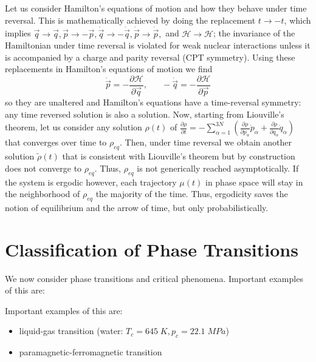 \documentclass[12pt, a4paper, oneside, openright, titlepage]{book}
\begin{document}
Let us consider Hamilton's equations of motion and how they behave under time reversal. This is mathematically achieved by doing the replacement $t\rightarrow -t$, which implies $\vec{q}\rightarrow \vec{q},\vec{p}\rightarrow -\vec{p},\dot{\vec{q}}\rightarrow -\dot{\vec{q}},\dot{\vec{p}} \rightarrow \dot{\vec{p}},$ and $\mathcal{H}\rightarrow \mathcal{H}$; the invariance of the Hamiltonian under time reversal is violated for weak nuclear interactions unless it is accompanied by a charge and parity reversal (CPT symmetry). Using these replacements in Hamilton's equations of motion we find \begin{equation*}
    \dot{\vec{p}} = -\frac{\partial \mathcal{H}}{\partial \vec{q}},\;\;\;\;\;\;-\dot{\vec{q}} = -\frac{\partial \mathcal{H}}{\partial \vec{p}}
\end{equation*}
so they are unaltered and Hamilton's equations have a time-reversal symmetry: any time reversed solution is also a solution. Now, starting from Liouville's theorem, let us consider any solution $\rho(t)$ of $\frac{\partial \rho}{\partial t} = -\sum_{\alpha=1}^{3N}\left(\frac{\partial \rho}{\partial p_{\alpha}}\dot{p}_{\alpha} + \frac{\partial \rho}{\partial q_{\alpha}}\dot{q}_{\alpha}\right)$ that converges over time to $\rho_{eq}$. Then, under time reversal we obtain another solution $\tilde{\rho}(t)$ that is consistent with Liouville's theorem but by construction does not converge to $\rho_{eq}$. Thus, $\rho_{eq}$ is not generically reached asymptotically. If the system is ergodic however, each trajectory $\mu(t)$ in phase space will stay in the neighborhood of $\rho_{eq}$ the majority of the time. Thus, ergodicity saves the notion of equilibrium and the arrow of time, but only probabilistically.



\chapter{Classification of Phase Transitions}


We now consider phase transitions and critical phenomena. Important examples of this are:

\begin{eg}
    Important examples of this are: \begin{itemize}
        \item liquid-gas transition (water: $T_c = 645\;K, p_c = 22.1\;MPa$)
        \item paramagnetic-ferromagnetic transition
    \end{itemize}
\end{eg}
\end{document}
